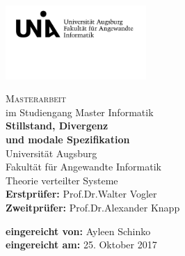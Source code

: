 \begin{titlepage}
\includegraphics[width=0.4\textwidth]{Uni_Aug_Logo_FAI_schwarz.png}
\vspace{-1cm}
\begin{center}
  \LARGE \textsc{Masterarbeit}\\
  \normalsize im Studiengang Master Informatik\\
  \vfill
  \Huge \textbf{Stillstand, Divergenz\\
  und modale Spezifikation}\\
  \vfill
  \Large Universität Augsburg\\
  Fakultät für Angewandte Informatik\\
  Theorie verteilter Systeme\\
  \vspace{1.5cm}
  \rmfamily \large \textbf{Erstprüfer:} Prof.\;Dr.\;Walter Vogler\\
  \rmfamily \large \textbf{Zweitprüfer:} Prof.\;Dr.\;Alexander Knapp
\end{center}
\vspace{1cm}
\large \textbf{eingereicht von:}
Ayleen Schinko\\
\textbf{eingereicht am:}
25. Oktober 2017 %
\end{titlepage}
